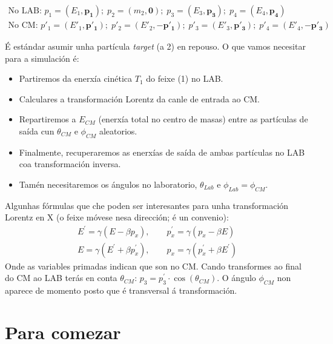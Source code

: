 \documentclass[11pt, a4paper]{article}
\newcommand{\vect}[1]{\boldsymbol{#1}}
\begin{document}
\begin{equation*}
    \begin{gathered}
        \text{No LAB:  }p_1=\left(E_1, \vect{p_1}\right); \; p_2=\left(m_2, \vect{0}\right); \; p_3=\left(E_3, \vect{p_3}\right); \; p_4=\left(E_4, \vect{p_4}\right) \\
        \text{No CM:  }p'_1=\left(E'_1, \vect{p'_1}\right); \;  p'_2=\left(E'_2, -\vect{p'_1}\right); \; p'_3=\left(E'_3, \vect{p'_3}\right); \; p'_4=\left(E'_4, -\vect{p'_3}\right)
    \end{gathered}
\end{equation*}

É estándar asumir unha partícula \textit{target} (a 2) en repouso. O que vamos necesitar para a simulación é:
\begin{itemize}
    \item Partiremos da enerxía cinética $T_1$ do feixe (1) no LAB.
    \item Calculares a transformación Lorentz da canle de entrada ao CM.
    \item Repartiremos a $E_{CM}$ (enerxía total no centro de masas) entre as partículas de saída cun $\theta_{CM}$ e $\phi_{CM}$ aleatorios.
    \item Finalmente, recuperaremos as enerxías de saída de ambas partículas no LAB coa transformación inversa.
    \item Tamén necesitaremos os ángulos no laboratorio, $\theta_{Lab}$ e $\phi_{Lab} = \phi_{CM}$.
\end{itemize}

Algunhas fórmulas que che poden ser interesantes para unha transformación Lorentz en X (o feixe móvese nesa dirección; é un convenio):
\begin{gather*}
    E^{\prime} = \gamma \left(E - \beta p_x\right), \qquad p^{\prime}_{x} = \gamma \left(p_x - \beta E\right)\\
    E = \gamma \left(E^{\prime} + \beta p_{x}^{\prime}\right), \qquad p_x = \gamma \left(p^{\prime}_x + \beta E^{\prime}\right)
\end{gather*}
Onde as variables primadas indican que son no CM. Cando transformes ao final do CM ao LAB terás en conta $\theta_{CM}$: $p_3 = p^{\prime}_3 \cdot\cos(\theta_{CM})$. O ángulo $\phi_{CM}$ non aparece de momento posto que é transversal á transformación.

\section{Para comezar}
\end{document}
